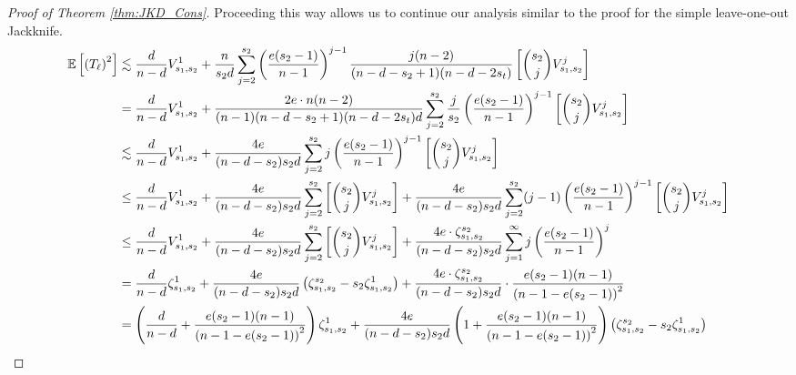 \begin{proof}[Proof of Theorem \ref{thm:JKD_Cons}]
	Proceeding this way allows us to continue our analysis similar to the proof for
	the simple leave-one-out Jackknife.
	\begin{equation}
		\begin{aligned}
			\mathbb{E}\left[\left(T_{\ell}\right)^2\right]
			 & \lesssim \frac{d}{n - d} V_{s_1, s_2}^{1} + \frac{n}{s_2 d}\sum_{j = 2}^{s_2}\left(\frac{e (s_2 - 1)}{n - 1}\right)^{j-1}
			\frac{j (n - 2)}{(n - d - s_2 + 1)(n - d - 2s_t)}\left[\binom{s_2}{j}V_{s_1, s_2}^{j}\right]                                                   \\
			 & = \frac{d}{n - d} V_{s_1, s_2}^{1} + \frac{ 2 e \cdot n (n - 2)}{(n - 1)(n - d - s_2 + 1)(n - d - 2s_t)d}
			\sum_{j = 2}^{s_2}\frac{j}{s_2} \left(\frac{e (s_2 - 1)}{n - 1}\right)^{j-1}
			\left[\binom{s_2}{j}V_{s_1, s_2}^{j}\right]                                                                                                    \\
			 & \lesssim \frac{d}{n - d} V_{s_1, s_2}^{1} + \frac{4e}{(n - d - s_2)s_2 d}
			\sum_{j = 2}^{s_2}j  \left(\frac{e (s_2 - 1)}{n - 1}\right)^{j-1}
			\left[\binom{s_2}{j}V_{s_1, s_2}^{j}\right]                                                                                                    \\
			 & \leq  \frac{d}{n - d} V_{s_1, s_2}^{1}
			+ \frac{4e}{(n - d - s_2)s_2 d} \sum_{j = 2}^{s_2}\left[\binom{s_2}{j}V_{s_1, s_2}^{j}\right]
			+ \frac{4e}{(n - d - s_2)s_2 d} \sum_{j = 2}^{s_2}(j-1)\left(\frac{e (s_2 - 1)}{n - 1}\right)^{j-1}\left[\binom{s_2}{j}V_{s_1, s_2}^{j}\right] \\
			 & \leq  \frac{d}{n - d} V_{s_1, s_2}^{1}
			+ \frac{4e}{(n - d - s_2)s_2 d} \sum_{j = 2}^{s_2}\left[\binom{s_2}{j}V_{s_1, s_2}^{j}\right]
			+ \frac{4e \cdot \zeta_{s_1, s_2}^{s_2}}{(n - d - s_2)s_2 d} \sum_{j = 1}^{\infty}j\left(\frac{e (s_2 - 1)}{n - 1}\right)^{j}                  \\
			 & = \frac{d}{n - d} \zeta_{s_1, s_2}^{1}
			+ \frac{4e}{(n - d - s_2)s_2 d} \left(\zeta_{s_1, s_2}^{s_2} - s_2 \zeta_{s_1, s_2}^{1}\right)
			+ \frac{4e \cdot \zeta_{s_1, s_2}^{s_2}}{(n - d - s_2)s_2 d} \cdot \frac{e (s_2 - 1)(n - 1)}{\left(n - 1 - e (s_2 - 1)\right)^2}               \\
			 & = \left(\frac{d}{n - d} + \frac{e (s_2 - 1)(n - 1)}{\left(n - 1 - e (s_2 - 1)\right)^2}\right) \zeta_{s_1, s_2}^{1}
			+ \frac{4e}{(n - d - s_2)s_2 d}\left(1 + \frac{e (s_2 - 1)(n - 1)}{\left(n - 1 - e (s_2 - 1)\right)^2}\right) \left(\zeta_{s_1, s_2}^{s_2} - s_2 \zeta_{s_1, s_2}^{1}\right)
		\end{aligned}
	\end{equation}


\end{proof}
